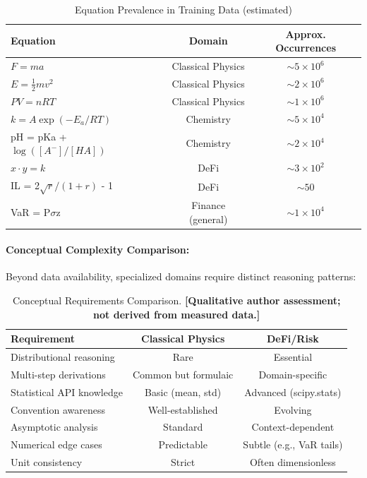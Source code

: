 \documentclass[twoside,11pt]{article}
\begin{document}
\begin{table}[H]
\centering
\caption{Equation Prevalence in Training Data (estimated)}
\label{tab:equation_prevalence}
\begin{tabular}{@{}lcc@{}}
\toprule
\textbf{Equation} & \textbf{Domain} & \textbf{Approx. Occurrences} \\
\midrule
$F = ma$ & Classical Physics & $\sim 5 \times 10^6$ \\
$E = \frac{1}{2}mv^2$ & Classical Physics & $\sim 2 \times 10^6$ \\
$PV = nRT$ & Classical Physics & $\sim 1 \times 10^6$ \\
$k = A\exp(-E_a/RT)$ & Chemistry & $\sim 5 \times 10^4$ \\
pH = pKa + $\log([A^{-}]/[HA])$ & Chemistry & $\sim 2 \times 10^4$ \\
$x \cdot y = k$ & DeFi & $\sim 3 \times 10^2$ \\
IL = 2$\sqrt{r}/(1+r)$ - 1 & DeFi & $\sim 50$ \\
VaR = P$\sigma$z & Finance (general) & $\sim 1 \times 10^4$ \\
\bottomrule
\end{tabular}
\end{table}


\paragraph{Conceptual Complexity Comparison:}

Beyond data availability, specialized domains require distinct reasoning patterns:

\begin{table}[H]
\centering
\caption{Conceptual Requirements Comparison.
  \textbf{[Qualitative author assessment; not derived from measured data.]}}
\label{tab:conceptual_complexity}
\begin{tabular}{@{}lcc@{}}
\toprule
\textbf{Requirement} & \textbf{Classical Physics} & \textbf{DeFi/Risk} \\
\midrule
Distributional reasoning & Rare & Essential \\
Multi-step derivations & Common but formulaic & Domain-specific \\
Statistical API knowledge & Basic (mean, std) & Advanced (scipy.stats) \\
Convention awareness & Well-established & Evolving \\
Asymptotic analysis & Standard & Context-dependent \\
Numerical edge cases & Predictable & Subtle (e.g., VaR tails) \\
Unit consistency & Strict & Often dimensionless \\
\bottomrule
\end{tabular}
\end{table}
\end{document}
